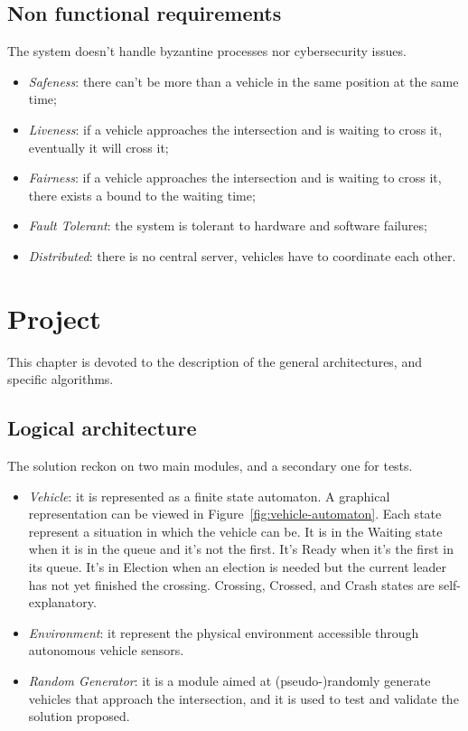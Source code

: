 \documentclass{memoir}
\begin{document}
\section{Non functional requirements}
The system doesn't handle byzantine processes nor cybersecurity issues.

\begin{itemize}
	\item \emph{Safeness}: there can't be more than a vehicle in the same position at the same time;
	\item \emph{Liveness}: if a vehicle approaches the intersection and is waiting to cross it, eventually it will cross it;
	\item \emph{Fairness}: if a vehicle approaches the intersection and is waiting to cross it, there exists a bound to the waiting time;
	\item \emph{Fault Tolerant}: the system is tolerant to hardware and software failures;
	\item \emph{Distributed}: there is no central server, vehicles have to coordinate each other.
\end{itemize}



\chapter{Project}\label{ch:project}
This chapter is devoted to the description of the general architectures, and specific algorithms.

\section{Logical architecture}
The solution reckon on two main modules, and a secondary one for tests.

\begin{itemize}
	\item \emph{Vehicle}: it is represented as a finite state automaton. A graphical representation can be viewed in Figure~\ref{fig:vehicle-automaton}. Each state represent a situation in which the vehicle can be. It is in the Waiting state when it is in the queue and it's not the first. It's Ready when it's the first in its queue. It's in Election when an election is needed but the current leader has not yet finished the crossing. Crossing, Crossed, and Crash states are self-explanatory.
	\item \emph{Environment}: it represent the physical environment accessible through autonomous vehicle sensors.
	\item \emph{Random Generator}: it is a module aimed at (pseudo-)randomly generate vehicles that approach the intersection, and it is used to test and validate the solution proposed.
\end{itemize}
\end{document}
